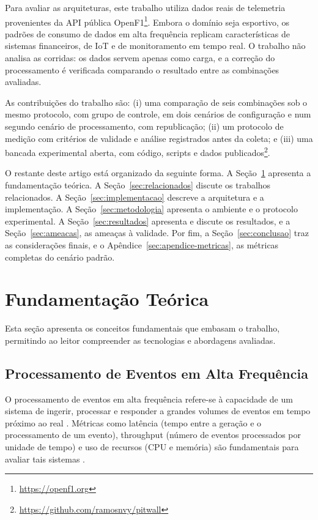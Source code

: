 \documentclass[12pt]{article}
\begin{document}
Para avaliar as arquiteturas, este trabalho utiliza dados reais de telemetria
provenientes da API pública OpenF1\footnote{\url{https://openf1.org}}. Embora o domínio
seja esportivo, os padrões de consumo de dados em alta frequência replicam
características de sistemas financeiros, de IoT e de monitoramento em tempo real. O
trabalho não analisa as corridas: os dados servem apenas como carga, e a correção do
processamento é verificada comparando o resultado entre as combinações avaliadas.

As contribuições do trabalho são: (i) uma comparação de seis combinações sob o mesmo
protocolo, com grupo de controle, em dois cenários de configuração e num segundo cenário
de processamento, com republicação; (ii) um protocolo de medição com critérios de validade
e análise registrados antes da coleta; e (iii) uma bancada experimental aberta, com
código, scripts e dados publicados\footnote{\url{https://github.com/ramosnvy/pitwall}}.

O restante deste artigo está organizado da seguinte forma. A Seção~\ref{sec:fundamentacao}
apresenta a fundamentação teórica. A Seção~\ref{sec:relacionados} discute os trabalhos
relacionados. A Seção~\ref{sec:implementacao} descreve a arquitetura e a implementação. A
Seção~\ref{sec:metodologia} apresenta o ambiente e o protocolo experimental. A
Seção~\ref{sec:resultados} apresenta e discute os resultados, e a
Seção~\ref{sec:ameacas}, as ameaças à validade. Por fim, a
Seção~\ref{sec:conclusao} traz as considerações finais, e o
Apêndice~\ref{sec:apendice-metricas}, as métricas completas do cenário padrão.


\section{Fundamentação Teórica}
\label{sec:fundamentacao}

Esta seção apresenta os conceitos fundamentais que embasam o trabalho, permitindo ao leitor
compreender as tecnologias e abordagens avaliadas.

\subsection{Processamento de Eventos em Alta Frequência}

O processamento de eventos em alta frequência refere-se à capacidade de um sistema de
ingerir, processar e responder a grandes volumes de eventos em tempo próximo ao real
\cite{luckham:2011,cugola:2012}. Métricas como latência (tempo entre a geração e o
processamento de um evento), throughput (número de eventos processados por unidade de
tempo) e uso de recursos (CPU e memória) são fundamentais para avaliar tais sistemas
\cite{jain:1991,fu:2021}.
\end{document}
